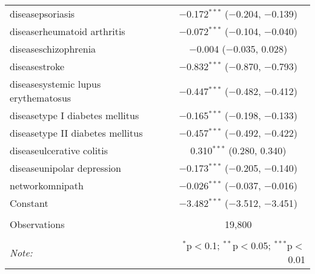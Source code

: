 \begin{table}[!htbp]
\begin{tabular}{@{\extracolsep{5pt}}lc}
  diseasepsoriasis & $-$0.172$^{***}$ ($-$0.204, $-$0.139) \\ 
  diseaserheumatoid arthritis & $-$0.072$^{***}$ ($-$0.104, $-$0.040) \\ 
  diseaseschizophrenia & $-$0.004 ($-$0.035, 0.028) \\ 
  diseasestroke & $-$0.832$^{***}$ ($-$0.870, $-$0.793) \\ 
  diseasesystemic lupus erythematosus & $-$0.447$^{***}$ ($-$0.482, $-$0.412) \\ 
  diseasetype I diabetes mellitus & $-$0.165$^{***}$ ($-$0.198, $-$0.133) \\ 
  diseasetype II diabetes mellitus & $-$0.457$^{***}$ ($-$0.492, $-$0.422) \\ 
  diseaseulcerative colitis & 0.310$^{***}$ (0.280, 0.340) \\ 
  diseaseunipolar depression & $-$0.173$^{***}$ ($-$0.205, $-$0.140) \\ 
  networkomnipath & $-$0.026$^{***}$ ($-$0.037, $-$0.016) \\ 
  Constant & $-$3.482$^{***}$ ($-$3.512, $-$3.451) \\ 
 \hline \\[-1.8ex] 
Observations & 19,800 \\ 
\hline 
\hline \\[-1.8ex] 
\textit{Note:}  & \multicolumn{1}{r}{$^{*}$p$<$0.1; $^{**}$p$<$0.05; $^{***}$p$<$0.01} \\ 
\end{tabular} 
\end{table} 
